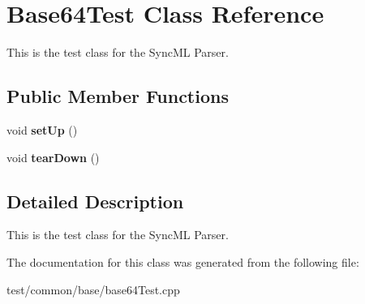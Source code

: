 \section{Base64Test Class Reference}
\label{classBase64Test}
This is the test class for the Sync\-ML Parser.  


\subsection*{Public Member Functions}
\begin{CompactItemize}
\item 
void \textbf{set\-Up} ()\label{classBase64Test_66388bc3d81949b596c97f44a1477a50}

\item 
void \textbf{tear\-Down} ()\label{classBase64Test_1aeae9183d189afc24b33c22ee841697}

\end{CompactItemize}


\subsection{Detailed Description}
This is the test class for the Sync\-ML Parser. 



The documentation for this class was generated from the following file:\begin{CompactItemize}
\item 
test/common/base/base64Test.cpp\end{CompactItemize}
